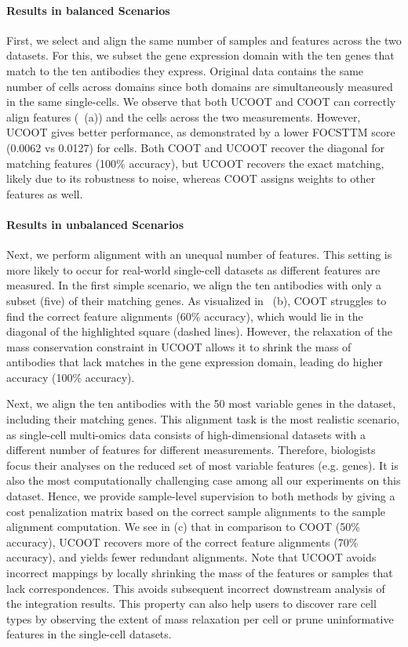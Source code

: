 \paragraph{Results in balanced Scenarios} First, we select and align the same number of samples and features
across the two datasets. For this, we subset the gene expression domain with the ten genes that
match to the ten antibodies they express. Original data contains the same number of cells
across domains since both domains are simultaneously measured in the same single-cells.
We observe that both UCOOT and COOT can correctly align features (~(a))
and the cells across the two measurements. However,
UCOOT gives better performance, as demonstrated by a lower FOCSTTM score (0.0062 vs 0.0127)
for cells. Both COOT and UCOOT recover the diagonal for matching features (100\% accuracy),
but UCOOT recovers the exact matching, likely due to its robustness to noise,
whereas COOT assigns weights to other features as well.

\paragraph{Results in unbalanced Scenarios} Next, we perform alignment with an unequal number of features.
This setting is more likely to occur for real-world single-cell datasets as different features
are measured. In the first simple scenario, we align the ten antibodies with only a subset (five)
of their matching genes. As visualized in ~(b),
COOT struggles to find the correct feature alignments (60\% accuracy),
which would lie in the diagonal of the highlighted square (dashed lines). However,
the relaxation of the mass conservation constraint in UCOOT allows it to shrink
the mass of antibodies that lack matches in the gene expression domain,
leading do higher accuracy (100\% accuracy).

Next, we align the ten antibodies with
the 50 most variable genes in the dataset, including their matching genes.
This alignment task is the most realistic scenario, as single-cell multi-omics data
consists of high-dimensional datasets with a different number of features for different measurements.
Therefore, biologists focus their analyses on the reduced set of most variable features (e.g. genes).
It is also the most computationally challenging case among all our experiments on this dataset.
Hence, we provide sample-level supervision to both methods by giving a cost penalization matrix
based on the correct sample alignments to the sample alignment computation.
We see in (c) that in comparison to COOT (50\% accuracy),
UCOOT recovers more of the correct feature alignments (70\% accuracy),
and yields fewer redundant alignments.
Note that UCOOT avoids incorrect mappings by locally shrinking the mass of the features or samples
that lack correspondences. This avoids subsequent incorrect downstream analysis of
the integration results. This property can also help users to discover rare cell types
by observing the extent of mass relaxation per cell or prune uninformative features in
the single-cell datasets.

